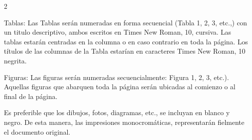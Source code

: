 \begin{multicols}{2}
{\par}


Tablas: Las Tablas serán numeradas en forma secuencial (Tabla 1, 2, 3, etc.,) con un titulo descriptivo, ambos escritos en Times New Roman, 10, cursiva. Las tablas estarán centradas en la columna o en caso contrario en toda la página. Los títulos de las columnas de la Tabla estarían en caracteres Times New Roman, 10 negrita.


Figuras: Las figuras serán numeradas secuencialmente: Figura 1, 2, 3, etc.).
Aquellas figuras que abarquen toda la página serán ubicadas al comienzo o al final de la página.


Es preferible que los dibujos, fotos, diagramas, etc., se incluyan en blanco y negro. De esta manera, las impresiones monocromáticas, representarán fielmente el documento original.

\end{multicols}

